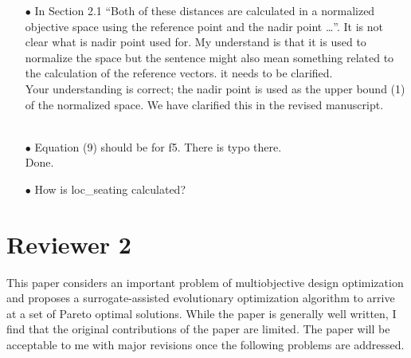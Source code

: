 \documentclass[onecolumn,10pt]{asme2ej}
\begin{document}
\begin{itemize}
\item[$\bullet$] In Section 2.1 “Both of these distances are calculated in a normalized objective space using the reference point and the nadir point …”. It is not clear what is nadir point used for. My understand is that it is used to normalize the space but the sentence might also mean something related to the calculation of the reference vectors. it needs to be clarified. \\
{\color{blue}
Your understanding is correct; the nadir point is used as the upper bound (1) of the normalized space. We have clarified this in the revised manuscript. \\
}\\


\item[$\bullet$] Equation (9) should be for f5. There is typo there. \\
{\color{blue} Done.}\\

\item[$\bullet$] {\color{red}How is loc\_seating calculated?}



\end{itemize}


\section*{Reviewer 2}

This paper considers an important problem of multiobjective design optimization and proposes a surrogate-assisted evolutionary optimization algorithm to arrive at a set of Pareto optimal solutions. While the paper is generally well written, I find that the original contributions of the paper are limited. The paper will be acceptable to me with major revisions once the following problems are addressed.
\end{document}
